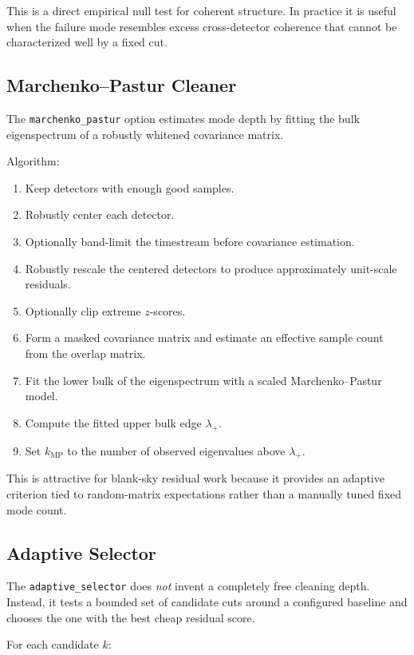 \documentclass[11pt]{article}
\begin{document}
This is a direct empirical null test for coherent structure. In practice it is
useful when the failure mode resembles excess cross-detector coherence that
cannot be characterized well by a fixed cut.

\subsection{Marchenko--Pastur Cleaner}

The \texttt{marchenko\_pastur} option estimates mode depth by fitting the bulk
eigenspectrum of a robustly whitened covariance matrix.

Algorithm:

\begin{enumerate}[leftmargin=1.5em]
\item Keep detectors with enough good samples.
\item Robustly center each detector.
\item Optionally band-limit the timestream before covariance estimation.
\item Robustly rescale the centered detectors to produce approximately
unit-scale residuals.
\item Optionally clip extreme \(z\)-scores.
\item Form a masked covariance matrix and estimate an effective sample count
from the overlap matrix.
\item Fit the lower bulk of the eigenspectrum with a scaled
Marchenko--Pastur model.
\item Compute the fitted upper bulk edge \(\lambda_+\).
\item Set \(k_{\mathrm{MP}}\) to the number of observed eigenvalues above
\(\lambda_+\).
\end{enumerate}

This is attractive for blank-sky residual work because it provides an adaptive
criterion tied to random-matrix expectations rather than a manually tuned fixed
mode count.

\subsection{Adaptive Selector}

The \texttt{adaptive\_selector} does \emph{not} invent a completely free cleaning
depth. Instead, it tests a bounded set of candidate cuts around a configured
baseline and chooses the one with the best cheap residual score.

For each candidate \(k\):
\end{document}
